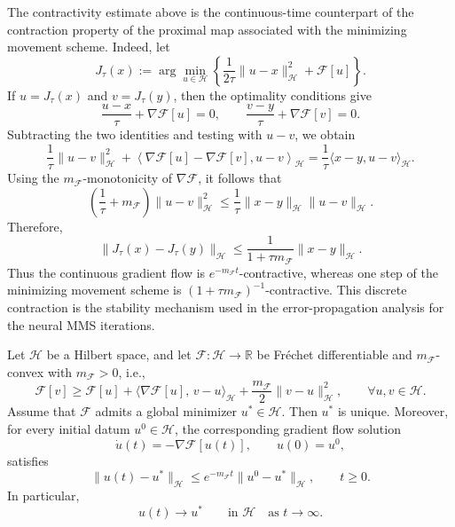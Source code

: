 \documentclass[twoside,11pt]{article}
\newcommand{\calF}{\mathcal{F}}
\newcommand{\calH}{\mathcal{H}}
\begin{document}
\begin{remark}
The contractivity estimate above is the continuous-time counterpart of the
contraction property of the proximal map associated with the minimizing movement
scheme. Indeed, let
\[
    J_\tau(x)
    :=
    \arg\min_{u\in\mathcal H}
    \left\{
        \frac{1}{2\tau}\|u-x\|_{\mathcal H}^2
        +
        \mathcal F[u]
    \right\}.
\]
If \(u=J_\tau(x)\) and \(v=J_\tau(y)\), then the optimality conditions give
\[
    \frac{u-x}{\tau}+\nabla\mathcal F[u]=0,
    \qquad
    \frac{v-y}{\tau}+\nabla\mathcal F[v]=0 .
\]
Subtracting the two identities and testing with \(u-v\), we obtain
\[
    \frac{1}{\tau}\|u-v\|_{\mathcal H}^2
    +
    \left\langle
    \nabla\mathcal F[u]-\nabla\mathcal F[v],
    u-v
    \right\rangle_{\mathcal H}
    =
    \frac{1}{\tau}\langle x-y,u-v\rangle_{\mathcal H}.
\]
Using the \(m_{\mathcal F}\)-monotonicity of \(\nabla\mathcal F\), it follows that
\[
    \left(\frac{1}{\tau}+m_{\mathcal F}\right)
    \|u-v\|_{\mathcal H}^2
    \le
    \frac{1}{\tau}
    \|x-y\|_{\mathcal H}\|u-v\|_{\mathcal H}.
\]
Therefore,
\[
    \|J_\tau(x)-J_\tau(y)\|_{\mathcal H}
    \le
    \frac{1}{1+\tau m_{\mathcal F}}
    \|x-y\|_{\mathcal H}.
\]
Thus the continuous gradient flow is \(e^{-m_{\mathcal F}t}\)-contractive,
whereas one step of the minimizing movement scheme is
\((1+\tau m_{\mathcal F})^{-1}\)-contractive. This discrete contraction is the
stability mechanism used in the error-propagation analysis for the neural MMS
iterations.
\end{remark}


\begin{theorem}\label{thm:gf-exp-conv}
Let $\calH$ be a Hilbert space, and let $\calF:\calH\to\mathbb R$ be Fr\'echet differentiable and $m_{\calF}$-convex with $m_{\calF}>0$, i.e.,
\[
\calF[v]\ge \calF[u]
+\langle \nabla\calF[u],\,v-u\rangle_{\calH}
+\frac{m_{\calF}}{2}\|v-u\|_{\calH}^2,
\qquad \forall u,v\in\calH.
\]
Assume that $\calF$ admits a global minimizer $u^\ast\in\calH$. Then $u^\ast$ is unique. Moreover, for every initial datum $u^0\in\calH$, the corresponding gradient flow solution
\[
\dot u(t)=-\nabla\calF[u(t)],
\qquad u(0)=u^0,
\]
satisfies
\[
\|u(t)-u^\ast\|_{\calH}
\le e^{-m_{\calF}t}\|u^0-u^\ast\|_{\calH},
\qquad t\ge0.
\]
In particular,
\[
u(t)\to u^\ast
\qquad \text{in }\calH \quad \text{as } t\to\infty.
\]
\end{theorem}
\end{document}
